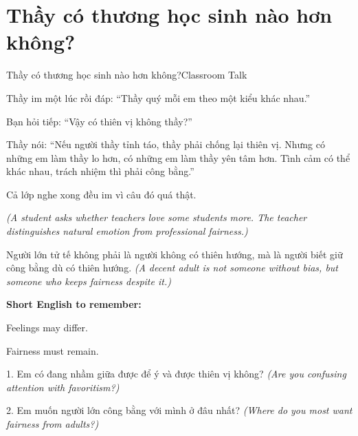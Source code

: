 \section{Thầy có thương học sinh nào hơn không?}
\begin{truyen}{Thầy có thương học sinh nào hơn không?}{Classroom Talk}

Thầy im một lúc rồi đáp: ``Thầy quý mỗi em theo một kiểu khác nhau.''

Bạn hỏi tiếp: ``Vậy có thiên vị không thầy?''

Thầy nói: ``Nếu người thầy tỉnh táo, thầy phải chống lại thiên vị. Nhưng có những em làm thầy lo hơn, có những em làm thầy yên tâm hơn. Tình cảm có thể khác nhau, trách nhiệm thì phải công bằng.''

Cả lớp nghe xong đều im vì câu đó quá thật.

\textit{(A student asks whether teachers love some students more. The teacher distinguishes natural emotion from professional fairness.)}
\end{truyen}

\begin{baihoc}
Người lớn tử tế không phải là người không có thiên hướng, mà là người biết giữ công bằng dù có thiên hướng.
\textit{(A decent adult is not someone without bias, but someone who keeps fairness despite it.)}
\end{baihoc}

\begin{ghinhoanh}
\textbf{Short English to remember:}

Feelings may differ.

Fairness must remain.
\end{ghinhoanh}

\begin{tuhocnhanh}
1. Em có đang nhầm giữa được để ý và được thiên vị không? \textit{(Are you confusing attention with favoritism?)}

2. Em muốn người lớn công bằng với mình ở đâu nhất? \textit{(Where do you most want fairness from adults?)}
\end{tuhocnhanh}
\ngancach


